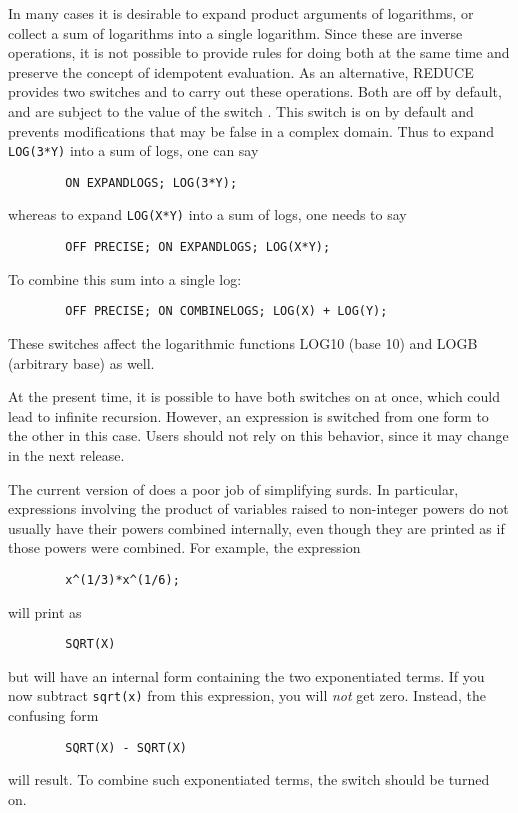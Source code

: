 
\hypertarget{switch:COMBINELOGS}{}
\hypertarget{switch:EXPANDLOGS}{}
In many cases it is desirable to expand product arguments of logarithms,
or collect a sum of logarithms into a single logarithm.  Since these are
inverse operations, it is not possible to provide rules for doing both at
the same time and preserve the {\REDUCE} concept of idempotent evaluation.
As an alternative, REDUCE provides two switches 
 and  to carry
out these operations.  Both are off by default, and are subject 
to the value of the switch . This switch is on
by default and prevents modifications that may be false in a complex domain.
Thus to expand \texttt{LOG(3*Y)} into a sum of logs, one can say
\begin{verbatim}
        ON EXPANDLOGS; LOG(3*Y);
\end{verbatim}
whereas to expand \texttt{LOG(X*Y)} into a sum of logs, one needs to say
\begin{verbatim}
        OFF PRECISE; ON EXPANDLOGS; LOG(X*Y);
\end{verbatim}
To combine this sum into a single log:
\begin{verbatim}
        OFF PRECISE; ON COMBINELOGS; LOG(X) + LOG(Y);
\end{verbatim}

These switches affect the logarithmic functions LOG10 (base 10) and LOGB
(arbitrary base) as well.

At the present time, it is possible to have both switches on at once,
which could lead to infinite recursion.  However, an expression is
switched from one form to the other in this case.  Users should not rely
on this behavior, since it may change in the next release.

\hypertarget{switch:COMBINEEXPT}{}
The current version of {\REDUCE} does a poor job of simplifying surds.  In
particular, expressions involving the product of variables raised to
non-integer powers do not usually have their powers combined internally,
even though they are printed as if those powers were combined.  For
example, the expression
\begin{verbatim}
        x^(1/3)*x^(1/6);
\end{verbatim}
will print as
\begin{verbatim}
        SQRT(X)
\end{verbatim}
but will have an internal form containing the two exponentiated terms.
If you now subtract \texttt{sqrt(x)} from this expression, you will
\emph{not} get zero.  Instead, the confusing form
\begin{verbatim}
        SQRT(X) - SQRT(X)
\end{verbatim}
will result.  To combine such exponentiated terms, the switch
 should be turned on.

